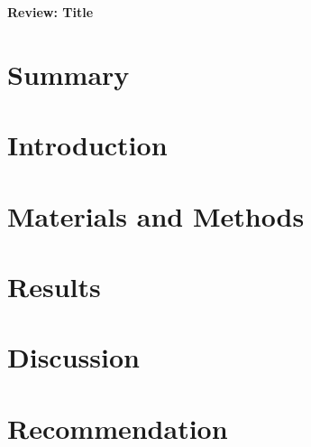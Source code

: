 \documentclass[11pt]{article}
\begin{document}
{\Large \textbf{Review: Title}}

\section*{Summary}

\section*{Introduction}

\section*{Materials and Methods}

\section*{Results}

\section*{Discussion}

\section*{Recommendation}
\end{document}
